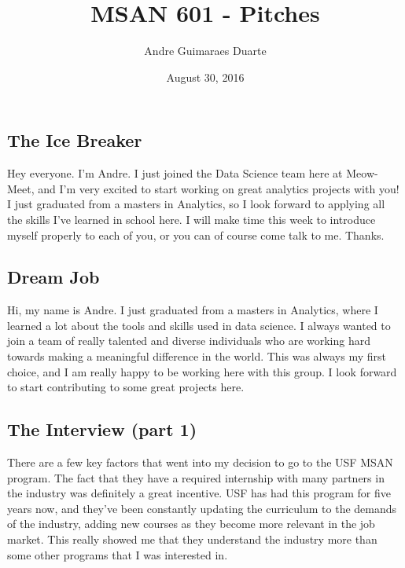 \documentclass[]{article}
\title{MSAN 601 - Pitches}
\author{Andre Guimaraes Duarte}
\date{August 30, 2016}
\begin{document}
\maketitle


\subsection*{The Ice Breaker}
Hey everyone. I'm Andre. I just joined the Data Science team here at Meow-Meet, and I'm very excited to start working on great analytics projects with you! I just graduated from a masters in Analytics, so I look forward to applying all the skills I've learned in school here. I will make time this week to introduce myself properly to each of you, or you can of course come talk to me. Thanks.

\subsection*{Dream Job}
Hi, my name is Andre. I just graduated from a masters in Analytics, where I learned a lot about the tools and skills used in data science. I always wanted to join a team of really talented and diverse individuals who are working hard towards making a meaningful difference in the world. This was always my first choice, and I am really happy to be working here with this group. I look forward to start contributing to some great projects here.

\subsection*{The Interview (part 1)}
There are a few key factors that went into my decision to go to the USF MSAN program. The fact that they have a required internship with many partners in the industry was definitely a great incentive. USF has had this program for five years now, and they've been constantly updating the curriculum to the demands of the industry, adding new courses as they become more relevant in the job market. This really showed me that they understand the industry more than some other programs that I was interested in.
\end{document}
